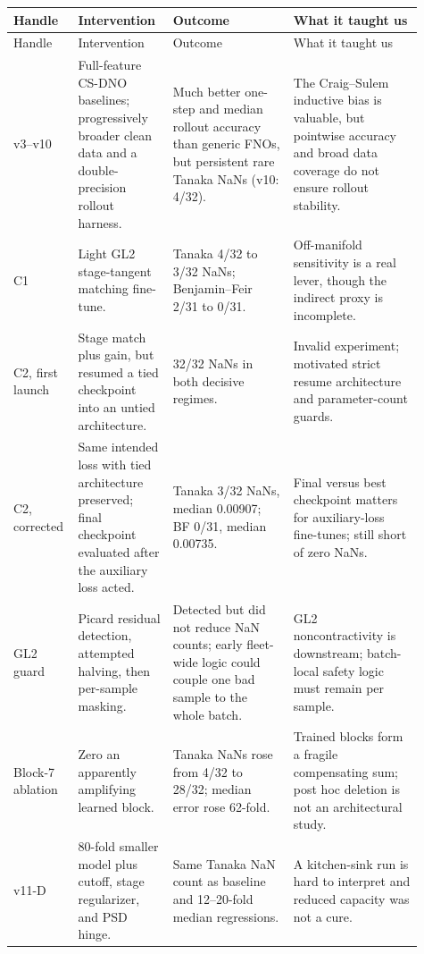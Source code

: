\documentclass[11pt]{article}
\begin{document}
\begin{longtable}{@{}p{0.10\linewidth}p{0.22\linewidth}p{0.29\linewidth}p{0.30\linewidth}@{}}
\toprule
Handle & Intervention & Outcome & What it taught us \\
\midrule
\endfirsthead
\toprule
Handle & Intervention & Outcome & What it taught us \\
\midrule
\endhead
v3--v10 & Full-feature CS-DNO baselines; progressively broader clean data and a
double-precision rollout harness. & Much better one-step and median rollout
accuracy than generic FNOs, but persistent rare Tanaka NaNs (v10: 4/32). & The
Craig--Sulem inductive bias is valuable, but pointwise accuracy and broad data
coverage do not ensure rollout stability. \\

C1 & Light GL2 stage-tangent matching fine-tune. & Tanaka 4/32 to 3/32 NaNs;
Benjamin--Feir 2/31 to 0/31. & Off-manifold sensitivity is a real lever, though
the indirect proxy is incomplete. \\

C2, first launch & Stage match plus gain, but resumed a tied checkpoint into an
untied architecture. & 32/32 NaNs in both decisive regimes. & Invalid
experiment; motivated strict resume architecture and parameter-count guards. \\

C2, corrected & Same intended loss with tied architecture preserved; final
checkpoint evaluated after the auxiliary loss acted. & Tanaka 3/32 NaNs,
median 0.00907; BF 0/31, median 0.00735. & Final versus best checkpoint matters
for auxiliary-loss fine-tunes; still short of zero NaNs. \\

GL2 guard & Picard residual detection, attempted halving, then per-sample
masking. & Detected but did not reduce NaN counts; early fleet-wide logic could
couple one bad sample to the whole batch. & GL2 noncontractivity is downstream;
batch-local safety logic must remain per sample. \\

Block-7 ablation & Zero an apparently amplifying learned block. & Tanaka NaNs
rose from 4/32 to 28/32; median error rose 62-fold. & Trained blocks form a
fragile compensating sum; post hoc deletion is not an architectural study. \\

v11-D & 80-fold smaller model plus cutoff, stage regularizer, and PSD hinge. &
Same Tanaka NaN count as baseline and 12--20-fold median regressions. & A
kitchen-sink run is hard to interpret and reduced capacity was not a cure. \\


\end{longtable}
\end{document}
